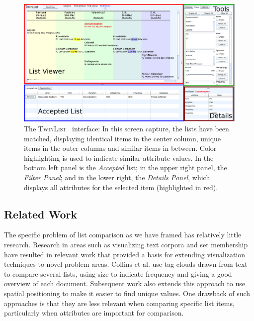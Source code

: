 \documentclass{chi2009}
\newcommand{\TwinList}{\textsc{TwinList}}
\newcommand{\Details}{\textit{Details Panel}}
\newcommand{\Filters}{\textit{Filter Panel}}
\begin{document}
\begin{figure}[t]
\begin{center}
\includegraphics[width=1\linewidth]{img/interface2.png}
\end{center}
   \caption{The \TwinList~ interface: In this screen capture, the lists have been matched, displaying identical items in the center column, unique items in the outer columns and similar items in between. Color highlighting is used to indicate similar attribute values. In the bottom left panel is the \textit{Accepted} list; in the upper right panel, the \Filters; and in the lower right, the \Details, which displays all attributes for the selected item (highlighted in red).}
   \label{fig:interface}
\end{figure}

\subsection{Related Work}
The specific problem of list comparison as we have framed has relatively little research. Research in areas such as visualizing text corpora and set membership have resulted in relevant work that provided a basis for extending visualization techniques to novel problem areas.  Collins et al.\cite{collins2009parallel} use tag clouds drawn from text to compare several lists, using size to indicate frequency and giving a good overview of each document. Subsequent work also extends this approach to use spatial positioning to make it easier to find unique values\cite{conwaytuscon11}. One drawback of such approaches is that they are less relevant when comparing specific list items, particularly when attributes are important for comparison. 
\end{document}
